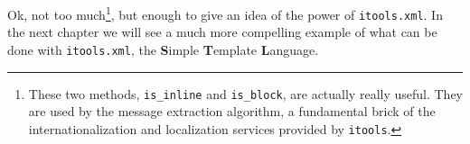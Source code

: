 Ok, not too much\footnote{These two methods, {\tt is\_inline} and
{\tt is\_block}, are actually really useful. They are used by the message
extraction algorithm, a fundamental brick of the internationalization and
localization services provided by {\tt itools}.}, but enough to give an
idea of the power of {\tt itools.xml}. In the next chapter we will see a
much more compelling example of what can be done with {\tt itools.xml},
the {\bf S}imple {\bf T}emplate {\bf L}anguage.



